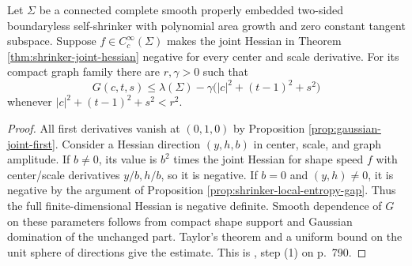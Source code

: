 \begin{lemma}\label{lem:entropy-joint-local-maximum}
Let $\Sigma$ be a connected complete smooth properly embedded two-sided boundaryless self-shrinker with polynomial area growth and zero constant tangent subspace. Suppose $f\in C_c^\infty(\Sigma)$ makes the joint Hessian in Theorem \ref{thm:shrinker-joint-hessian} negative for every center and scale derivative. For its compact graph family there are $r,\gamma>0$ such that
\[
 G(c,t,s)\leq\lambda(\Sigma)
 -\gamma\bigl(|c|^2+(t-1)^2+s^2\bigr)
\]
whenever $|c|^2+(t-1)^2+s^2<r^2$.
\end{lemma}
\begin{proof}
All first derivatives vanish at $(0,1,0)$ by Proposition \ref{prop:gaussian-joint-first}. Consider a Hessian direction $(y,h,b)$ in center, scale, and graph amplitude. If $b\ne0$, its value is $b^2$ times the joint Hessian for shape speed $f$ with center/scale derivatives $y/b,h/b$, so it is negative. If $b=0$ and $(y,h)\ne0$, it is negative by the argument of Proposition \ref{prop:shrinker-local-entropy-gap}. Thus the full finite-dimensional Hessian is negative definite. Smooth dependence of $G$ on these parameters follows from compact shape support and Gaussian domination of the unchanged part. Taylor's theorem and a uniform bound on the unit sphere of directions give the estimate. This is \cite{CM12}, step (1) on p.~790.
\end{proof}

